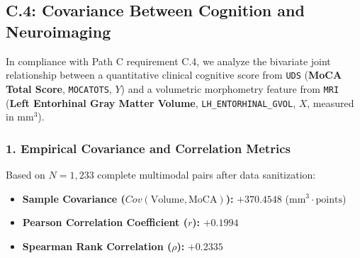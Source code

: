 \documentclass[11pt, a4paper]{article}
\begin{document}
\subsection{C.4: Covariance Between Cognition and Neuroimaging}
In compliance with Path C requirement C.4, we analyze the bivariate joint relationship between a quantitative clinical cognitive score from \texttt{UDS} (\textbf{MoCA Total Score}, \texttt{MOCATOTS}, $Y$) and a volumetric morphometry feature from \texttt{MRI} (\textbf{Left Entorhinal Gray Matter Volume}, \texttt{LH\_ENTORHINAL\_GVOL}, $X$, measured in $\text{mm}^3$).

\subsubsection*{1. Empirical Covariance and Correlation Metrics}
Based on $N = 1,233$ complete multimodal pairs after data sanitization:
\begin{itemize}
    \item \textbf{Sample Covariance ($Cov(\text{Volume}, \text{MoCA})$):} $+370.4548$ ($\text{mm}^3 \cdot \text{points}$)
    \item \textbf{Pearson Correlation Coefficient ($r$):} $+0.1994$
    \item \textbf{Spearman Rank Correlation ($\rho$):} $+0.2335$
\end{itemize}
\end{document}
